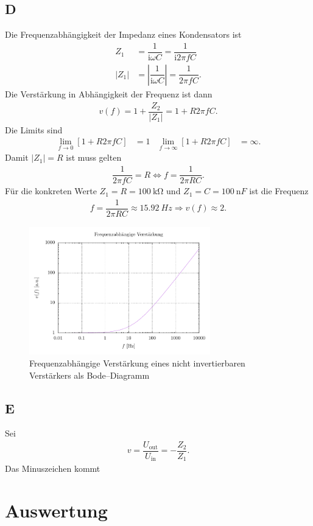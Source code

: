 \documentclass[a4paper,12pt]{article}
\numberwithin{equation}{section}
\begin{document}
\subsection{D}
Die Frequenzabhängigkeit der Impedanz eines Kondensators ist
\begin{align} 
        Z_1 &= \dfrac{1}{\text{i}\omega C}=\dfrac{1}{\text{i}2\pi fC}\\
        |Z_1| &= \left|\dfrac{1}{\text{i}\omega C}\right| = \dfrac{1}{2\pi fC}
.\end{align} 
Die Verstärkung in Abhängigkeit der Frequenz ist dann
\begin{align} 
        v\left(f\right)=1+\dfrac{Z_2}{|Z_1|}=1+R2\pi fC
.\end{align} 
Die Limits sind
\begin{align} 
        \lim_{f \rightarrow 0}\left[1+R2\pi fC\right] &= 1 & \lim_{f \rightarrow \infty}\left[1+R2\pi fC\right] &= \infty
.\end{align} 
Damit $|Z_1| = R$ ist muss gelten
\begin{align} 
        \dfrac{1}{2\pi fC}=R\Leftrightarrow f=\dfrac{1}{2\pi RC}
.\end{align} 
Für die konkreten Werte $Z_1=R=\SI{100}{\kilo\ohm}$ und $Z_1=C=\SI{100}{\nano F}$ ist die Frequenz
\begin{align} 
        f=\dfrac{1}{2\pi RC}\approx \SI{15.92}{Hz}\Rightarrow v\left(f\right)\approx 2
.\end{align} 
\begin{figure}[h]
        \centering
        \includegraphics[width=0.7\textwidth]{plot_crop.pdf}
        \caption{Frequenzabhängige Verstärkung eines nicht invertierbaren Verstärkers als Bode--Diagramm}
\end{figure}

\subsection{E}
Sei
\begin{align} 
        v=\dfrac{U_\text{out}}{U_\text{in}}=-\dfrac{Z_2}{Z_1}
.\end{align} 
Das Minuszeichen kommt

\newpage
\section{Auswertung}

\clearpage
\listoffigures
\listoftables
%
%

\end{document}
